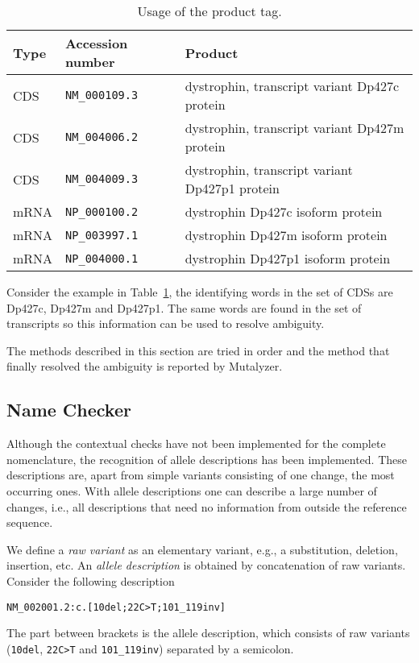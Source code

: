\documentclass{article}
\begin{document}
\begin{table}[]
  \caption{Usage of the product tag.}
  \begin{center}
    \begin{tabular}{lll}
      Type & Accession number & Product\\
      \hline
      CDS  & \texttt{NM\_000109.3} & dystrophin, transcript variant Dp427c
        protein\\
      CDS  & \texttt{NM\_004006.2} & dystrophin, transcript variant Dp427m
        protein\\
      CDS  & \texttt{NM\_004009.3} & dystrophin, transcript variant Dp427p1
        protein\\
      mRNA & \texttt{NP\_000100.2} & dystrophin Dp427c isoform protein\\
      mRNA & \texttt{NP\_003997.1} & dystrophin Dp427m isoform protein\\
      mRNA & \texttt{NP\_004000.1} & dystrophin Dp427p1 isoform protein\\
    \end{tabular}
  \end{center}
  \label{tab:product}
\end{table}

Consider the example in Table~\ref{tab:product}, the identifying words in the
set of CDSs are Dp427c, Dp427m and Dp427p1. The same words are found in the set
of transcripts so this information can be used to resolve ambiguity.

The methods described in this section are tried in order and the method that
finally resolved the ambiguity is reported by Mutalyzer.

\subsection{Name Checker} \label{subsec:namecheck}
Although the contextual checks have not been implemented for the complete
nomenclature, the recognition of allele descriptions has been implemented.
These descriptions are, apart from simple variants consisting of one change,
the most occurring ones. With allele descriptions one can describe a large
number of changes, i.e., all descriptions that need no information from outside
the reference sequence.

We define a \emph{raw variant} as an elementary variant, e.g., a substitution,
deletion, insertion, etc. An \emph{allele description} is obtained by
concatenation of raw variants. Consider the following description
\begin{center}
  \texttt{NM\_002001.2:c.[10del;22C>T;101\_119inv]}
\end{center}
The part between brackets is
the allele description, which consists of raw variants (\texttt{10del},
\texttt{22C>T} and \texttt{101\_119inv}) separated by a semicolon.
\end{document}
